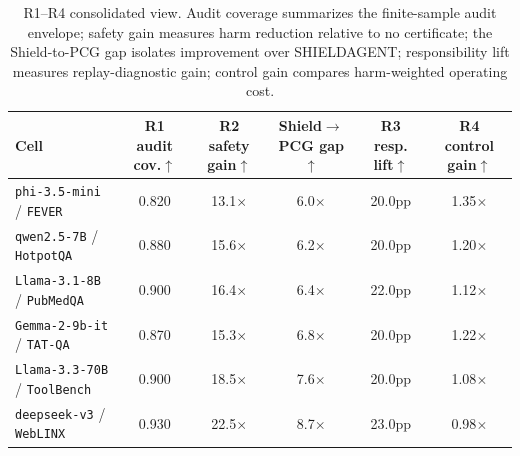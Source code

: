 \begin{table}[t]
\centering
\caption{\small R1--R4 consolidated view. Audit coverage summarizes the finite-sample audit envelope; safety gain measures harm reduction relative to no certificate; the Shield-to-PCG gap isolates improvement over SHIELDAGENT; responsibility lift measures replay-diagnostic gain; control gain compares harm-weighted operating cost.}
\label{tab:r1_r4_combined}
\scriptsize
\begin{tabular}{lccccc}
\toprule
Cell & R1 audit cov.$\uparrow$ & R2 safety gain$\uparrow$ & Shield$\rightarrow$PCG gap$\uparrow$ & R3 resp. lift$\uparrow$ & R4 control gain$\uparrow$ \\
\midrule
\texttt{phi-3.5-mini} / \texttt{FEVER} & 0.820 & 13.1$\times$ & 6.0$\times$ & 20.0pp & 1.35$\times$ \\
\texttt{qwen2.5-7B} / \texttt{HotpotQA} & 0.880 & 15.6$\times$ & 6.2$\times$ & 20.0pp & 1.20$\times$ \\
\texttt{Llama-3.1-8B} / \texttt{PubMedQA} & 0.900 & 16.4$\times$ & 6.4$\times$ & 22.0pp & 1.12$\times$ \\
\texttt{Gemma-2-9b-it} / \texttt{TAT-QA} & 0.870 & 15.3$\times$ & 6.8$\times$ & 20.0pp & 1.22$\times$ \\
\texttt{Llama-3.3-70B} / \texttt{ToolBench} & 0.900 & 18.5$\times$ & 7.6$\times$ & 20.0pp & 1.08$\times$ \\
\texttt{deepseek-v3} / \texttt{WebLINX} & 0.930 & 22.5$\times$ & 8.7$\times$ & 23.0pp & 0.98$\times$ \\
\bottomrule
\end{tabular}
\end{table}
